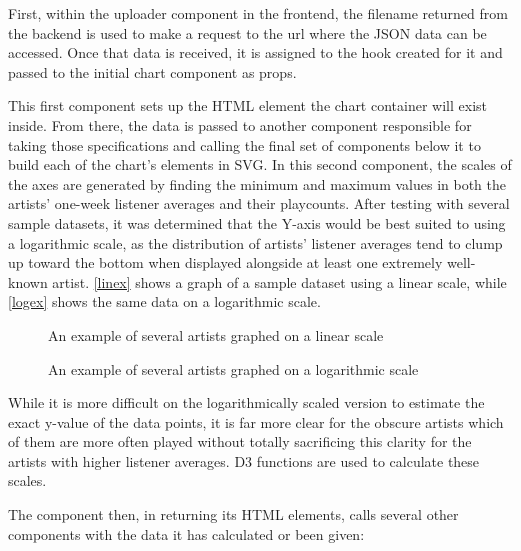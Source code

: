 First, within the uploader component in the frontend, the filename returned from the backend is used to make a request to the url where the JSON data can be accessed. Once that data is received, it is assigned to the hook created for it and passed to the initial chart component as props.

This first component sets up the HTML element the chart container will exist inside. From there, the data is passed to another component responsible for taking those specifications and calling the final set of components below it to build each of the chart's elements in SVG. In this second component, the scales of the axes are generated by finding the minimum and maximum values in both the artists' one-week listener averages and their playcounts. After testing with several sample datasets, it was determined that the Y-axis would be best suited to using a logarithmic scale, as the distribution of artists' listener averages tend to clump up toward the bottom when displayed alongside at least one extremely well-known artist. \autoref{linex} shows a graph of a sample dataset using a linear scale, while \autoref{logex} shows the same data on a logarithmic scale.

\begin{figure}[!ht]
	\begin{center}
		\caption{An example of several artists graphed on a linear scale}\label{linex}
	\end{center}
\end{figure}

\begin{figure}[!ht]
	\begin{center}
		\caption{An example of several artists graphed on a logarithmic scale}\label{logex}
	\end{center}
\end{figure}

While it is more difficult on the logarithmically scaled version to estimate the exact y-value of the data points, it is far more clear for the obscure artists which of them are more often played without totally sacrificing this clarity for the artists with higher listener averages. D3 functions are used to calculate these scales.

The component then, in returning its HTML elements, calls several other components with the data it has calculated or been given:

